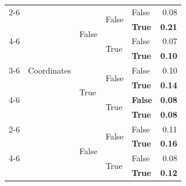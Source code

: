 \documentclass{article}
\begin{document}
\begin{table}
\begin{center}
{\begin{tabular}{@{}lllllr@{}}
    \cmidrule{2-6}
                                            & \multirow[c]{9}{*}{Coordinates}   & \multirow[c]{4}{*}{False} & \multirow[c]{2}{*}{False} & False                 & 0.08 \\
                                            &                                   &                           &                           & \textbf{True}         & \textbf{0.21} \\
    \cmidrule{4-6}
                                            &                                   &                           & \multirow[c]{2}{*}{True}  & False                 & 0.07 \\
                                            &                                   &                           &                           & \textbf{True}         & \textbf{0.10} \\
    \cmidrule{3-6}
                                            &                                   & \multirow[c]{4}{*}{True}  & \multirow[c]{2}{*}{False} & False                 & 0.10 \\
                                            &                                   &                           &                           & \textbf{True}         & \textbf{0.14} \\
    \cmidrule{4-6}
                                            &                                   &                           & \multirow[c]{2}{*}{True}  & \textbf{False}        & \textbf{0.08} \\
                                            &                                   &                           &                           & \textbf{True}         & \textbf{0.08} \\
    \cmidrule{2-6}
                                            & \multirow[c]{9}{*}{RGB}           & \multirow[c]{4}{*}{False} & \multirow[c]{2}{*}{False} & False                 & 0.11 \\
                                            &                                   &                           &                           & \textbf{True}         & \textbf{0.16} \\
    \cmidrule{4-6}
                                            &                                   &                           & \multirow[c]{2}{*}{True}  & False                 & 0.08 \\
                                            &                                   &                           &                           & \textbf{True}         & \textbf{0.12} \\

\end{tabular}}
\end{center}
\end{table}
\end{document}
